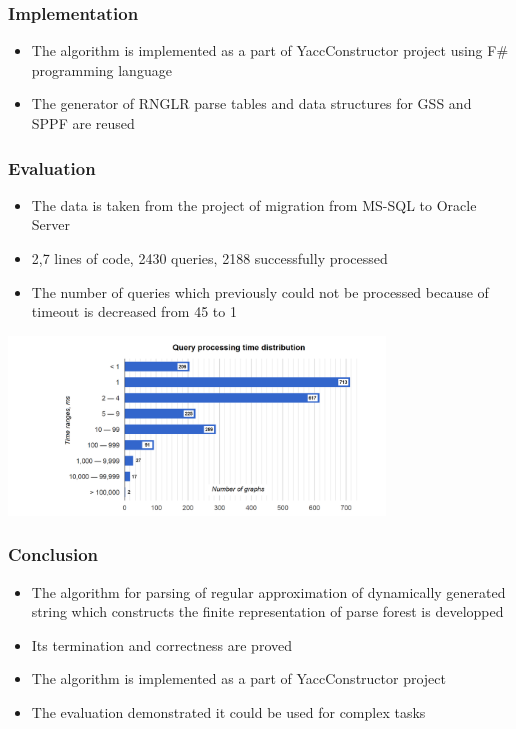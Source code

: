 \documentclass{beamer}
\begin{document}
\begin{frame}
  \transwipe[direction=90]
  \frametitle{Implementation}
  \begin{itemize}
    \item The algorithm is implemented as a part of YaccConstructor project 
using F\# programming language
    \item The generator of RNGLR parse tables and data structures for GSS and 
SPPF are reused
 \end{itemize}
\end{frame}

\begin{frame}[t]
  \transwipe[direction=90]
  \frametitle{Evaluation}
  \begin{itemize}
    \item The data is taken from the project of migration from MS-SQL to Oracle Server 
    \item 2,7 lines of code, 2430 queries, 2188 successfully processed
    \item The number of queries which previously could not be processed because 
of timeout is decreased from 45 to 1
  \end{itemize}
  \includegraphics[width=10cm]{pictures/dist.png}
\end{frame}


\begin{frame}
  \transwipe[direction=90]
  \frametitle{Conclusion}
  \begin{itemize}
    \item The algorithm for parsing of regular approximation of dynamically 
generated string which constructs the finite representation of parse forest is 
developped
    \item Its termination and correctness are proved
    \item The algorithm is implemented as a part of YaccConstructor project
    \item The evaluation demonstrated it could be used for complex tasks
  \end{itemize}
\end{frame}
\end{document}
